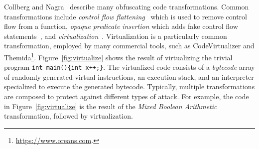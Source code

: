 Collberg and Nagra~\cite{collberg_surreptitious_2010} describe many obfuscating code transformations. Common transformations include {\em control flow flattening}~\cite{wang00security} which is used to remove control flow from a function,  {\em opaque predicate insertion} which adds fake control flow statements~\cite{collberg1997taxonomy}, and {\em virtualization}~\cite{yadegari15generic}. Virtualization is a particularly common transformation, employed by many commercial tools, such as CodeVirtualizer and Themida\footnote{\url{https://www.oreans.com}.}. Figure~\ref{fig:virtualize} shows the result of virtualizing the trivial program {\tt int main()\{int x++;\}}. The virtualized code consists of a {\em bytecode} array of randomly generated virtual instructions, an execution stack, and  an interpreter specialized to execute the generated bytecode. Typically, multiple transformations are composed to protect against different types of attack. For example, the code in Figure~\ref{fig:virtualize} is the result of the {\em Mixed Boolean Arithmetic}~\cite{Zhou:2007:IHS:1784964.1784971} transformation, followed by virtualization.